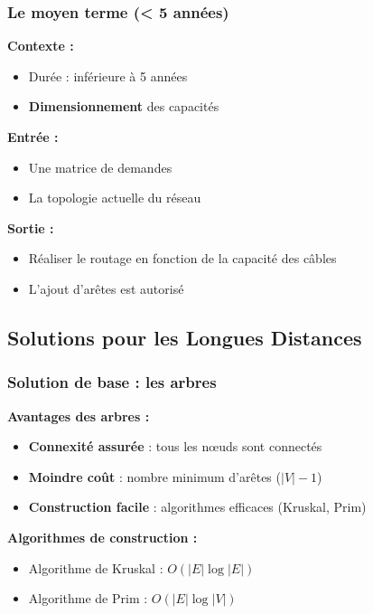 \documentclass[12pt,a4paper]{article}
\begin{document}
\subsubsection{Le moyen terme (< 5 années)}

\begin{definition}
\textbf{Contexte :}
\begin{itemize}
    \item Durée : inférieure à 5 années
    \item \textcolor{titrebleu}{\textbf{Dimensionnement}} des capacités
\end{itemize}

\textbf{Entrée :}
\begin{itemize}
    \item Une matrice de demandes
    \item La topologie actuelle du réseau
\end{itemize}

\textbf{Sortie :}
\begin{itemize}
    \item Réaliser le routage en fonction de la capacité des câbles
    \item L'ajout d'arêtes est autorisé
\end{itemize}
\end{definition}

\newpage
\subsection{Solutions pour les Longues Distances}

\subsubsection{Solution de base : les arbres}

\begin{definition}
\textbf{Avantages des arbres :}
\begin{itemize}
    \item \textcolor{titrebleu}{\textbf{Connexité assurée}} : tous les nœuds sont connectés
    \item \textcolor{defvert}{\textbf{Moindre coût}} : nombre minimum d'arêtes ($|V| - 1$)
    \item \textcolor{algoviolet}{\textbf{Construction facile}} : algorithmes efficaces (Kruskal, Prim)
\end{itemize}

\textbf{Algorithmes de construction :}
\begin{itemize}
    \item Algorithme de Kruskal : $O(|E| \log |E|)$
    \item Algorithme de Prim : $O(|E| \log |V|)$
\end{itemize}
\end{definition}
\end{document}
